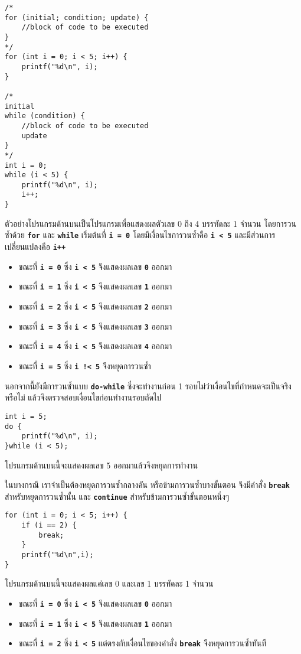 \begin{lstlisting}
/*
for (initial; condition; update) {
	//block of code to be executed
}
*/
for (int i = 0; i < 5; i++) {
	printf("%d\n", i);
}

/*
initial
while (condition) {
	//block of code to be executed
    update
}
*/
int i = 0;
while (i < 5) {
	printf("%d\n", i);
    i++;
}
\end{lstlisting}
ตัวอย่างโปรแกรมด้านบนเป็นโปรแกรมเพื่อแสดงผลตัวเลข 0 ถึง 4 บรรทัดละ 1 จำนวน โดยการวนซ้ำด้วย \textbf{\texttt{for}} และ \textbf{\texttt{while}} เริ่มต้นที่ \textbf{\texttt{i = 0}} โดยมีเงื่อนไขการวนซ้ำคือ \textbf{\texttt{i < 5}} และมีส่วนการเปลี่ยนแปลงคือ \textbf{\texttt{i++}}
\begin{itemize}
\item ขณะที่ \textbf{\texttt{i = 0}} ซึ่ง \textbf{\texttt{i < 5}} จึงแสดงผลเลข \textbf{\texttt{0}} ออกมา
\item ขณะที่ \textbf{\texttt{i = 1}} ซึ่ง \textbf{\texttt{i < 5}} จึงแสดงผลเลข \textbf{\texttt{1}} ออกมา
\item ขณะที่ \textbf{\texttt{i = 2}} ซึ่ง \textbf{\texttt{i < 5}} จึงแสดงผลเลข \textbf{\texttt{2}} ออกมา
\item ขณะที่ \textbf{\texttt{i = 3}} ซึ่ง \textbf{\texttt{i < 5}} จึงแสดงผลเลข \textbf{\texttt{3}} ออกมา
\item ขณะที่ \textbf{\texttt{i = 4}} ซึ่ง \textbf{\texttt{i < 5}} จึงแสดงผลเลข \textbf{\texttt{4}} ออกมา
\item ขณะที่ \textbf{\texttt{i = 5}} ซึ่ง \textbf{\texttt{i !< 5}} จึงหยุดการวนซ้ำ
\end{itemize}
นอกจากนี้ยังมีการวนซ้ำแบบ \textbf{\texttt{do-while}} ซึ่งจะทำงานก่อน 1 รอบไม่ว่าเงื่อนไขที่กำหนดจะเป็นจริงหรือไม่ แล้วจึงตรวจสอบเงื่อนไขก่อนทำงานรอบถัดไป
\begin{lstlisting}
int i = 5;
do {
	printf("%d\n", i);
}while (i < 5);
\end{lstlisting}
โปรแกรมด้านบนนี้จะแสดงผลเลข 5 ออกมาแล้วจึงหยุดการทำงาน

ในบางกรณี เราจำเป็นต้องหยุดการวนซ้ำกลางคัน หรือข้ามการวนซ้ำบางขั้นตอน จึงมีคำสั่ง \textbf{\texttt{break}} สำหรับหยุดการวนซ้ำนั้น และ \textbf{\texttt{continue}} สำหรับข้ามการวนซ้ำขั้นตอนหนึ่งๆ
\begin{lstlisting}
for (int i = 0; i < 5; i++) {
	if (i == 2) {
    	break;
    }
	printf("%d\n",i);
}
\end{lstlisting}
โปรแกรมด้านบนนี้จะแสดงผลแค่เลข 0 และเลข 1 บรรทัดละ 1 จำนวน
\begin{itemize}
\item ขณะที่ \textbf{\texttt{i = 0}} ซึ่ง \textbf{\texttt{i < 5}} จึงแสดงผลเลข \textbf{\texttt{0}} ออกมา
\item ขณะที่ \textbf{\texttt{i = 1}} ซึ่ง \textbf{\texttt{i < 5}} จึงแสดงผลเลข \textbf{\texttt{1}} ออกมา
\item ขณะที่ \textbf{\texttt{i = 2}} ซึ่ง \textbf{\texttt{i < 5}} แต่ตรงกับเงื่อนไขของคำสั่ง \textbf{\texttt{break}} จึงหยุดการวนซ้ำทันที
\end{itemize}

